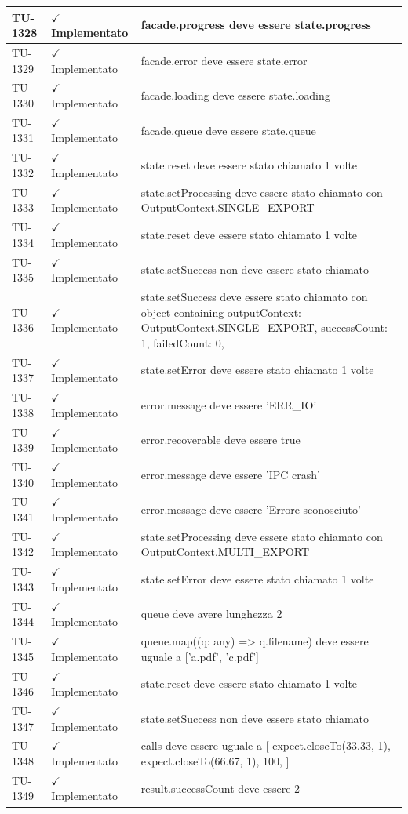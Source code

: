 ﻿\documentclass[a4paper,12pt]{article}
\newcommand{\ok}{\textcolor{green!60!black}{$\checkmark$ Implementato}}
\begin{document}
\begin{longtable}{|p{2cm}|p{3.5cm}|p{9.5cm}|}
\hline
TU-1328 & \ok & facade.progress deve essere state.progress \\
\hline
TU-1329 & \ok & facade.error deve essere state.error \\
\hline
TU-1330 & \ok & facade.loading deve essere state.loading \\
\hline
TU-1331 & \ok & facade.queue deve essere state.queue \\
\hline
TU-1332 & \ok & state.reset deve essere stato chiamato 1 volte \\
\hline
TU-1333 & \ok & state.setProcessing deve essere stato chiamato con OutputContext.SINGLE\_EXPORT \\
\hline
TU-1334 & \ok & state.reset deve essere stato chiamato 1 volte \\
\hline
TU-1335 & \ok & state.setSuccess non deve essere stato chiamato \\
\hline
TU-1336 & \ok & state.setSuccess deve essere stato chiamato con object containing { outputContext: OutputContext.SINGLE\_EXPORT, successCount: 1, failedCount: 0, } \\
\hline
TU-1337 & \ok & state.setError deve essere stato chiamato 1 volte \\
\hline
TU-1338 & \ok & error.message deve essere 'ERR\_IO' \\
\hline
TU-1339 & \ok & error.recoverable deve essere true \\
\hline
TU-1340 & \ok & error.message deve essere 'IPC crash' \\
\hline
TU-1341 & \ok & error.message deve essere 'Errore sconosciuto' \\
\hline
TU-1342 & \ok & state.setProcessing deve essere stato chiamato con OutputContext.MULTI\_EXPORT \\
\hline
TU-1343 & \ok & state.setError deve essere stato chiamato 1 volte \\
\hline
TU-1344 & \ok & queue deve avere lunghezza 2 \\
\hline
TU-1345 & \ok & queue.map((q: any) => q.filename) deve essere uguale a ['a.pdf', 'c.pdf'] \\
\hline
TU-1346 & \ok & state.reset deve essere stato chiamato 1 volte \\
\hline
TU-1347 & \ok & state.setSuccess non deve essere stato chiamato \\
\hline
TU-1348 & \ok & calls deve essere uguale a [ expect.closeTo(33.33, 1), expect.closeTo(66.67, 1), 100, ] \\
\hline
TU-1349 & \ok & result.successCount deve essere 2 \\

\end{longtable}
\end{document}
